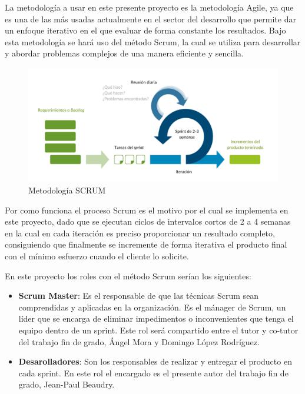 \documentclass[../../main.tex]{subfiles}
\begin{document}
La metodología a usar en este presente proyecto es la metodología Agile, ya que es una de las más usadas actualmente en el sector del desarrollo que permite dar un enfoque iterativo en el que evaluar de forma constante los resultados.
Bajo esta metodología se hará uso del método Scrum, la cual se utiliza para desarrollar y abordar problemas complejos de
una manera eficiente y sencilla.

\begin{figure}[h]
\centering
\includegraphics[width=\textwidth]{images/1_introduccion/scrum.png}
\caption{Metodología SCRUM}
\end{figure}

Por como funciona el proceso Scrum es el motivo por el cual se implementa en este proyecto, dado que se ejecutan ciclos de intervalos cortos de 2 a 4 semanas en la cual en cada iteración es preciso proporcionar un resultado completo, consiguiendo que finalmente se incremente de forma iterativa el producto final con el mínimo esfuerzo cuando el cliente lo solicite.

En este proyecto los roles con el método Scrum serían los siguientes:
\begin{itemize}
    \item \textbf{Scrum Master}: Es el responsable de que las técnicas Scrum sean comprendidas y aplicadas en la organización. Es el mánager de Scrum, un líder que se encarga de eliminar impedimentos o inconvenientes que tenga el equipo dentro de un sprint. Este rol será compartido entre el tutor y co-tutor del trabajo fin de grado, Ángel Mora y Domingo López Rodríguez.
    \item \textbf{Desarolladores}: Son los responsables de realizar y entregar el producto en cada sprint. En este rol el encargado es el presente autor del trabajo fin de grado, Jean-Paul Beaudry. 
\end{itemize}
\end{document}
